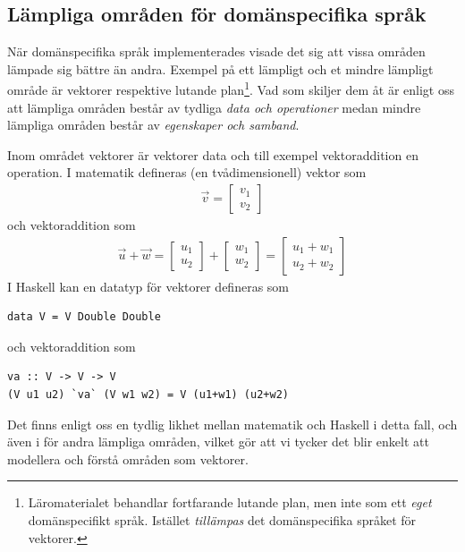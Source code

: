 \subsection{Lämpliga områden för domänspecifika språk}\label{sec:lampligt}

När domänspecifika språk implementerades visade det sig att vissa områden lämpade sig bättre än andra. Exempel på ett lämpligt och et mindre lämpligt område är vektorer respektive lutande plan\footnote{Läromaterialet behandlar fortfarande lutande plan, men inte som ett \textit{eget} domänspecifikt språk. Istället \textit{tillämpas} det domänspecifika språket för vektorer.}. Vad som skiljer dem åt är enligt oss att lämpliga områden består av tydliga \textit{data och operationer} medan mindre lämpliga områden består av \textit{egenskaper och samband}.

Inom området vektorer är vektorer data och till exempel vektoraddition en operation. I matematik defineras (en tvådimensionell) vektor som
\begin{align*}
  \vec{v} = \begin{bmatrix}
              v_1 \\
              v_2
            \end{bmatrix}
\end{align*}
och vektoraddition som
\begin{align*}
  \vec{u} + \vec{w} = \begin{bmatrix}
                        u_1 \\
                        u_2
                      \end{bmatrix}
                    + \begin{bmatrix}
                        w_1 \\
                        w_2
                      \end{bmatrix}
                    = \begin{bmatrix}
                        u_1 + w_1 \\
                        u_2 + w_2
                      \end{bmatrix}
\end{align*}
I Haskell kan en datatyp för vektorer defineras som
\begin{lstlisting}
data V = V Double Double
\end{lstlisting}
och vektoraddition som
\begin{lstlisting}
va :: V -> V -> V
(V u1 u2) `va` (V w1 w2) = V (u1+w1) (u2+w2)
\end{lstlisting}
Det finns enligt oss en tydlig likhet mellan matematik och Haskell i detta fall, och även i för andra lämpliga områden, vilket gör att vi tycker det blir enkelt att modellera och förstå områden som vektorer.

